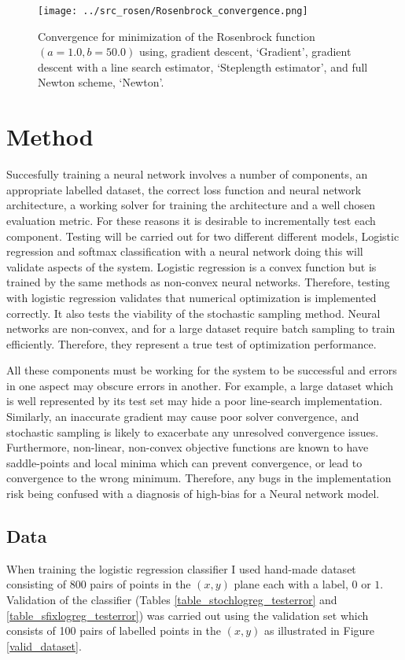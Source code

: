 \documentclass[11pt,twocolumn]{article}
\begin{document}
\begin{figure}[!ht]
\centering
\texttt{[image: ../src\_rosen/Rosenbrock\_convergence.png]}
\caption{Convergence for minimization of the Rosenbrock function $(a=1.0, b=50.0)$ using, gradient descent, `Gradient', gradient descent with a line search estimator, `Steplength estimator', and full Newton scheme, `Newton'.}\label{Rosenbrock_conv1}
\end{figure}

\section{Method}
Succesfully training a neural network involves a number of components, an appropriate labelled dataset, the correct loss function and neural network architecture, a working solver for training the architecture and a well chosen evaluation metric.  For these reasons it is desirable to incrementally test each component. Testing will be carried out for two different different models, Logistic regression and softmax classification with a neural network doing this will validate aspects of the system. Logistic regression is a convex function but is trained by the same methods as non-convex neural networks. Therefore, testing with logistic regression validates that numerical optimization is implemented correctly. It also tests the viability of the stochastic sampling method. Neural networks are non-convex, and for a large dataset require batch sampling to train efficiently. Therefore, they represent a true test of optimization performance. 

All these components must be working for the system to be successful and errors in one aspect may obscure errors in another. For example, a large dataset which is well represented by its test set may hide a poor line-search implementation. Similarly, an inaccurate gradient may cause poor solver convergence, and stochastic sampling is likely to exacerbate any unresolved convergence issues. Furthermore, non-linear, non-convex objective functions are known to have saddle-points and local minima which can prevent convergence, or lead to convergence to the wrong minimum. Therefore, any bugs in the implementation risk being confused with a diagnosis of high-bias for a Neural network model.

\subsection{Data} 
When training the logistic regression classifier I used hand-made dataset consisting of 800 pairs of points in the $(x,y)$ plane each with a label, $0$ or $1$. Validation of the classifier (Tables \ref{table_stochlogreg_testerror} and \ref{table_sfixlogreg_testerror}) was carried out using the validation set which consists of 100 pairs of labelled points in the $(x,y)$ as illustrated in Figure \ref{valid_dataset}.
\end{document}
